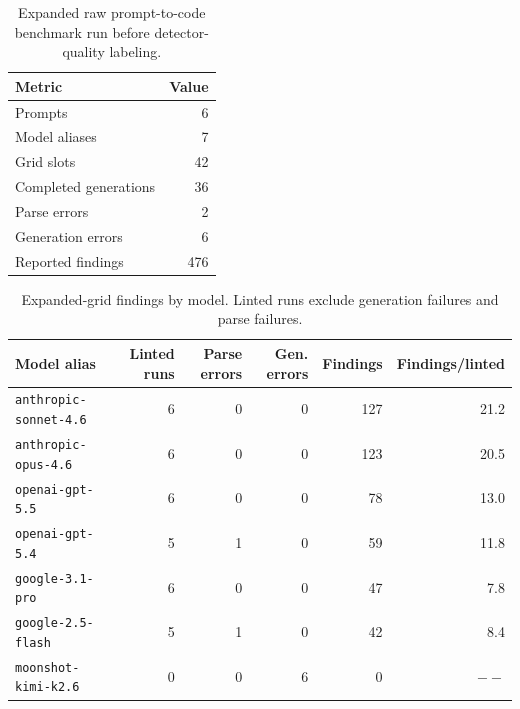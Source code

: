 
\begin{table}[ht]
  \centering
  \begin{tabular}{lr}
    \toprule
    Metric & Value \\
    \midrule
    Prompts & 6 \\
    Model aliases & 7 \\
    Grid slots & 42 \\
    Completed generations & 36 \\
    Parse errors & 2 \\
    Generation errors & 6 \\
    Reported findings & 476 \\
    \bottomrule
  \end{tabular}
  \caption{Expanded raw prompt-to-code benchmark run before detector-quality labeling.}
  \label{tab:expanded-grid}
\end{table}

\begin{table}[ht]
  \centering
  \small
  \begin{tabular}{lrrrrr}
    \toprule
    Model alias & Linted runs & Parse errors & Gen. errors & Findings & Findings/linted \\
    \midrule
    \texttt{anthropic-sonnet-4.6} & 6 & 0 & 0 & 127 & 21.2 \\
    \texttt{anthropic-opus-4.6} & 6 & 0 & 0 & 123 & 20.5 \\
    \texttt{openai-gpt-5.5} & 6 & 0 & 0 & 78 & 13.0 \\
    \texttt{openai-gpt-5.4} & 5 & 1 & 0 & 59 & 11.8 \\
    \texttt{google-3.1-pro} & 6 & 0 & 0 & 47 & 7.8 \\
    \texttt{google-2.5-flash} & 5 & 1 & 0 & 42 & 8.4 \\
    \texttt{moonshot-kimi-k2.6} & 0 & 0 & 6 & 0 & $--$ \\
    \bottomrule
  \end{tabular}
  \caption{Expanded-grid findings by model. Linted runs exclude generation failures and parse failures.}
  \label{tab:expanded-by-model}
\end{table}

